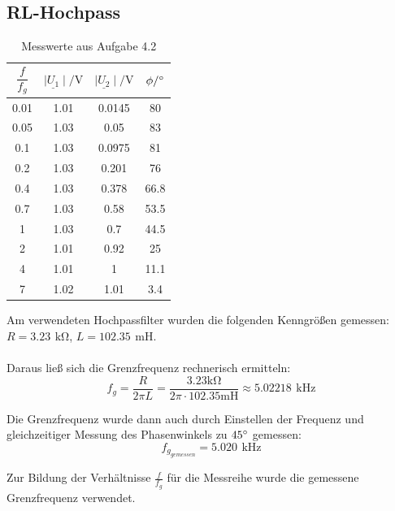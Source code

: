 \documentclass[a4paper, 12pt]{article}
\begin{document}
  \subsection{RL-Hochpass}
    \begin{table}[H]
    \begin{center}
    \begin{tabular}{|c|c|c|c|}
    \hline
    $\dfrac{f}{f_g}$  & $ \mid \underline{U_1} \mid / \si{\volt}$   & $\mid \underline{U_2} \mid / \si{\volt}$    & $\phi / \degree$ \\
    \hline
    0.01 & 1.01 & 0.0145 & 80    \\
    0.05 & 1.03 & 0.05   & 83    \\
    0.1  & 1.03 & 0.0975 & 81    \\
    0.2  & 1.03 & 0.201  & 76    \\
    0.4  & 1.03 & 0.378  & 66.8  \\
    0.7  & 1.03 & 0.58   & 53.5  \\
    1    & 1.03 & 0.7    & 44.5  \\
    2    & 1.01 & 0.92   & 25    \\
    4    & 1.01 & 1      & 11.1  \\
    7    & 1.02 & 1.01   & 3.4   \\
    \hline
    \end{tabular}
    \end{center}
    \caption*{Messwerte aus Aufgabe 4.2}
    \end{table}

    \noindent Am verwendeten Hochpassfilter wurden die folgenden Kenngrößen gemessen:\\
    \vspace{0.4cm}
    $R = 3.23 \,\ \si{\kilo\ohm}$,
    $L = 102.35 \,\ \si{\milli\henry}$.\\\\
    Daraus ließ sich die Grenzfrequenz rechnerisch ermitteln:
    $$ f_g = \frac{R}{2 \pi L} = \frac{3.23 \si{\kilo\ohm}}{ 2 \pi \cdot 102.35 \si{\milli\henry}} \approx 5.02218 \,\ \si{\kilo\hertz}$$

    \noindent Die Grenzfrequenz wurde dann auch durch Einstellen der Frequenz und gleichzeitiger Messung des Phasenwinkels zu $45 \degree$ gemessen:
    $$f_{g_{gemessen}} = 5.020 \,\ \si{\kilo\hertz}$$

    \noindent Zur Bildung der Verhältnisse $\frac{f}{f_g}$ für die Messreihe wurde die gemessene Grenzfrequenz verwendet.\\
\end{document}
